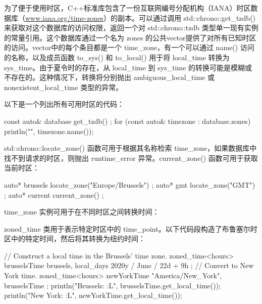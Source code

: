 为了便于使用时区，C++标准库包含了一份互联网编号分配机构（IANA）时区数据库（\url{www.iana.org/time-zones}）的副本。可以通过调用 std::chrono::get\_tzdb() 来获取对这个数据库的访问权限，返回一个对 std::chrono::tzdb 类型单一现有实例的常量引用。这个数据库通过一个名为 zones 的公共vector提供了对所有已知时区的访问。vector中的每个条目都是一个 time\_zone，有一个可以通过 name() 访问的名称，以及成员函数 to\_sys() 和 to\_local() 用于将 local\_time 转换为 sys\_time。由于夏令时的存在，从 local\_time 到 sys\_time 的转换可能是模糊或不存在的。这种情况下，转换将分别抛出 ambiguous\_local\_time 或 nonexistent\_local\_time 类型的异常。

以下是一个列出所有可用时区的代码：

\begin{cpp}
const auto& database { get_tzdb() };
for (const auto& timezone : database.zones) {
    println("{}", timezone.name());
}
\end{cpp}

std::chrono::locate\_zone() 函数可用于根据其名称检索 time\_zone，如果数据库中找不到请求的时区，则抛出 runtime\_error 异常。current\_zone() 函数可用于获取当前时区：

\begin{cpp}
auto* brussels { locate_zone("Europe/Brussels") };
auto* gmt { locate_zone("GMT") };
auto* current { current_zone() };
\end{cpp}

time\_zone 实例可用于在不同时区之间转换时间：


zoned\_time 类用于表示特定时区中的 time\_point。以下代码段构造了布鲁塞尔时区中的特定时间，然后将其转换为纽约时间：

\begin{cpp}
// Construct a local time in the Brussels' time zone.
zoned_time<hours> brusselsTime{ brussels, local_days { 2020y / June / 22d } + 9h };
// Convert to New York time.
zoned_time<hours> newYorkTime { "America/New_York", brusselsTime };
println("Brussels: {:L}", brusselsTime.get_local_time());
println("New York: {:L}", newYorkTime.get_local_time());
\end{cpp}










